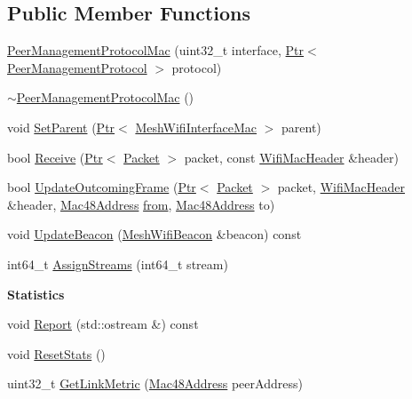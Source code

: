 \subsection*{Public Member Functions}
\begin{DoxyCompactItemize}
\item 
\hyperlink{classns3_1_1dot11s_1_1PeerManagementProtocolMac_a416514b3215257dacc973e5020590a81}{Peer\+Management\+Protocol\+Mac} (uint32\+\_\+t interface, \hyperlink{classns3_1_1Ptr}{Ptr}$<$ \hyperlink{classns3_1_1dot11s_1_1PeerManagementProtocol}{Peer\+Management\+Protocol} $>$ protocol)
\item 
\hyperlink{classns3_1_1dot11s_1_1PeerManagementProtocolMac_aab93a3407af2e9d0335c457175aafa87}{$\sim$\+Peer\+Management\+Protocol\+Mac} ()
\item 
void \hyperlink{classns3_1_1dot11s_1_1PeerManagementProtocolMac_a23001a924ac221192ef4a35d2e56c844}{Set\+Parent} (\hyperlink{classns3_1_1Ptr}{Ptr}$<$ \hyperlink{classns3_1_1MeshWifiInterfaceMac}{Mesh\+Wifi\+Interface\+Mac} $>$ parent)
\item 
bool \hyperlink{classns3_1_1dot11s_1_1PeerManagementProtocolMac_a2c235d74f54dc4f10d0bb6454f27a421}{Receive} (\hyperlink{classns3_1_1Ptr}{Ptr}$<$ \hyperlink{classns3_1_1Packet}{Packet} $>$ packet, const \hyperlink{classns3_1_1WifiMacHeader}{Wifi\+Mac\+Header} \&header)
\item 
bool \hyperlink{classns3_1_1dot11s_1_1PeerManagementProtocolMac_a124edd9a9cce0b323ff5118d6f0b4069}{Update\+Outcoming\+Frame} (\hyperlink{classns3_1_1Ptr}{Ptr}$<$ \hyperlink{classns3_1_1Packet}{Packet} $>$ packet, \hyperlink{classns3_1_1WifiMacHeader}{Wifi\+Mac\+Header} \&header, \hyperlink{classns3_1_1Mac48Address}{Mac48\+Address} \hyperlink{lte__amc_8m_a1b4c81ff74eb1a626b5ade44c81004b3}{from}, \hyperlink{classns3_1_1Mac48Address}{Mac48\+Address} to)
\item 
void \hyperlink{classns3_1_1dot11s_1_1PeerManagementProtocolMac_a47a86b6b3fca4339460cc7cf1f479430}{Update\+Beacon} (\hyperlink{classns3_1_1MeshWifiBeacon}{Mesh\+Wifi\+Beacon} \&beacon) const 
\item 
int64\+\_\+t \hyperlink{classns3_1_1dot11s_1_1PeerManagementProtocolMac_a8cf18a872519853fd08bdd1a9abec774}{Assign\+Streams} (int64\+\_\+t stream)
\end{DoxyCompactItemize}
\begin{Indent}{\bf Statistics}\par
\begin{DoxyCompactItemize}
\item 
void \hyperlink{classns3_1_1dot11s_1_1PeerManagementProtocolMac_a74a34708f19d4a7855f2bd9b7a12a8e8}{Report} (std\+::ostream \&) const 
\item 
void \hyperlink{classns3_1_1dot11s_1_1PeerManagementProtocolMac_a8cecca792d7be6b233219d6a9cf6f870}{Reset\+Stats} ()
\item 
uint32\+\_\+t \hyperlink{classns3_1_1dot11s_1_1PeerManagementProtocolMac_ae20fbb02a44f125a7eb3f8322b120f33}{Get\+Link\+Metric} (\hyperlink{classns3_1_1Mac48Address}{Mac48\+Address} peer\+Address)
\end{DoxyCompactItemize}
\end{Indent}
